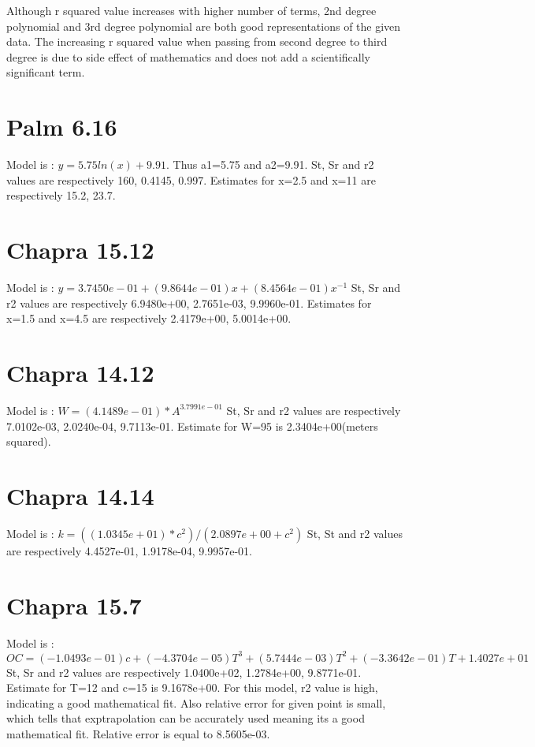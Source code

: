 \documentclass{article}
\begin{document}
Although r squared value increases with higher number of terms, 2nd degree polynomial and 3rd degree polynomial are both good representations of the given data. The increasing r squared value when passing from second degree to third degree is due to side effect of mathematics and does not add a scientifically significant term.

\section{Palm 6.16}
Model is : $y=5.75ln(x)+9.91$. Thus a1=5.75 and a2=9.91.
St, Sr and r2 values are respectively 160, 0.4145, 0.997.
Estimates for x=2.5 and x=11 are respectively 15.2, 23.7.
\section{Chapra 15.12}
Model is :  $y= 3.7450e-01 + (9.8644e-01)x + (8.4564e-01)x^{-1}$
St, Sr and r2 values are respectively 6.9480e+00, 2.7651e-03, 9.9960e-01.
Estimates for x=1.5 and x=4.5 are respectively 2.4179e+00, 5.0014e+00.

\section{Chapra 14.12}
Model is : $W=(4.1489e-01)*A^{3.7991e-01}$
St, Sr and r2 values are respectively 7.0102e-03, 2.0240e-04, 9.7113e-01.
Estimate for W=95 is 2.3404e+00(meters squared).

\section{Chapra 14.14}
Model is : $k=((1.0345e+01)*c^2)/(2.0897e+00+c^2)$
St, St and r2 values are respectively 4.4527e-01, 1.9178e-04, 9.9957e-01.
\section{Chapra 15.7}

Model is : $ OC=(-1.0493e-01)c + (-4.3704e-05)T^3 + (5.7444e-03)T^2 + (-3.3642e-01)T + 1.4027e+01 $
St, Sr and r2 values are respectively 1.0400e+02, 1.2784e+00, 9.8771e-01.
Estimate for T=12 and c=15 is 9.1678e+00.
For this model, r2 value is high, indicating a good mathematical fit. Also relative error for given point is small, which tells that exptrapolation can be accurately used meaning its a good mathematical fit.
Relative error is equal to 8.5605e-03.
\end{document}
